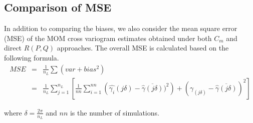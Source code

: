 \subsection{Comparison of MSE}

In addition to comparing the biases, we also consider the mean square error (MSE) of the MOM cross variogram estimates obtained under both $C_m$ and direct $R(P,Q)$ approaches. The overall MSE is calculated based on the following formula.
\begin{eqnarray*}
MSE &=& \frac{1}{n_L} \sum (var + bias^2) \\
    &= & \frac{1}{n_L} \sum_{j=1}^{n_L} \left[ \frac{1}{nn}\sum_{i=1}^{nn}\left(\hat{\gamma_{i}}(j\delta)-\overline{\hat{\gamma}(j\delta)})^2\right) +  (\gamma_(j\delta) - \overline{\hat{\gamma}(j\delta)})^2 \right]
\end{eqnarray*}

\noi where $\delta = \frac{2\pi}{n_L}$ and $nn$ is the number of simulations.

